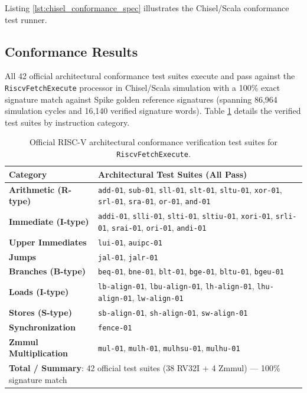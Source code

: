 Listing \ref{lst:chisel_conformance_spec} illustrates the Chisel/Scala conformance test runner.


\subsection{Conformance Results}

All 42 official architectural conformance test suites execute and pass against the \texttt{RiscvFetchExecute} processor in Chisel/Scala simulation with a 100\% exact signature match against Spike golden reference signatures (spanning 86,964 simulation cycles and 16,140 verified signature words). Table \ref{tab:conformance_results} details the verified test suites by instruction category.

\begin{table}[htbp]
\centering
\small
\begin{tabularx}{\textwidth}{|l|X|}
\hline
\textbf{Category} & \textbf{Architectural Test Suites (All Pass)} \\
\hline
\textbf{Arithmetic (R-type)} & \texttt{add-01}, \texttt{sub-01}, \texttt{sll-01}, \texttt{slt-01}, \texttt{sltu-01}, \texttt{xor-01}, \texttt{srl-01}, \texttt{sra-01}, \texttt{or-01}, \texttt{and-01} \\
\hline
\textbf{Immediate (I-type)}  & \texttt{addi-01}, \texttt{slli-01}, \texttt{slti-01}, \texttt{sltiu-01}, \texttt{xori-01}, \texttt{srli-01}, \texttt{srai-01}, \texttt{ori-01}, \texttt{andi-01} \\
\hline
\textbf{Upper Immediates}     & \texttt{lui-01}, \texttt{auipc-01} \\
\hline
\textbf{Jumps}               & \texttt{jal-01}, \texttt{jalr-01} \\
\hline
\textbf{Branches (B-type)}   & \texttt{beq-01}, \texttt{bne-01}, \texttt{blt-01}, \texttt{bge-01}, \texttt{bltu-01}, \texttt{bgeu-01} \\
\hline
\textbf{Loads (I-type)}      & \texttt{lb-align-01}, \texttt{lbu-align-01}, \texttt{lh-align-01}, \texttt{lhu-align-01}, \texttt{lw-align-01} \\
\hline
\textbf{Stores (S-type)}     & \texttt{sb-align-01}, \texttt{sh-align-01}, \texttt{sw-align-01} \\
\hline
\textbf{Synchronization}     & \texttt{fence-01} \\
\hline
\textbf{Zmmul Multiplication}& \texttt{mul-01}, \texttt{mulh-01}, \texttt{mulhsu-01}, \texttt{mulhu-01} \\
\hline
\multicolumn{2}{|l|}{\textbf{Total / Summary}: 42 official test suites (38 RV32I + 4 Zmmul) --- 100\% signature match} \\
\hline
\end{tabularx}
\caption{Official RISC-V architectural conformance verification test suites for \texttt{RiscvFetchExecute}.}\label{tab:conformance_results}
\end{table}

